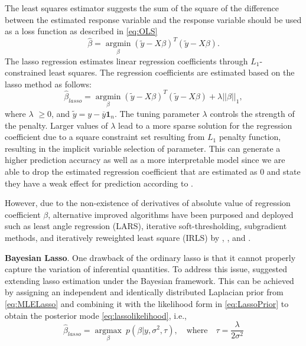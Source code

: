The least squares estimator suggests the sum of the square of the difference between the estimated response variable and the response variable should be used as a loss function as described in \autoref{eq:OLS}
\begin{equation}
\label{eq:OLS}
\widehat{\beta} = \underset{\beta}{\operatorname{argmin}}  (\widetilde{y} - X\beta)^T(\widetilde{y}-X\beta).
\end{equation}
The lasso regression estimates linear regression coefficients through $L_1$- constrained least squares. The regression coefficients are estimated based on the lasso method as follows:
\begin{equation}
	\label{eq:lasso1}
	\widehat{\beta}_{lasso} = \underset{\beta}{\operatorname{argmin}} (\widetilde{y}-X\beta)^T(\widetilde{y}-X\beta) + \lambda ||\beta||_1,
\end{equation}
where $\lambda$ $\geq 0$, and $\widetilde{y} =  y - \overline{y}\textbf{1}_n$. The tuning parameter $\lambda$ controls the strength of the penalty. Larger values of $\lambda$ lead to a more sparse solution for the regression coefficient due to a square constraint set resulting from $L_1$ penalty function, resulting in the implicit variable selection of parameter. This can generate a higher prediction accuracy as well as a more interpretable model since we are able to drop the estimated regression coefficient that are estimated as 0 and state they have a weak effect for prediction according to \cite{tibshirani_1996}.

However, due to the non-existence of derivatives of absolute value of regression coefficient $\beta$, alternative improved algorithms have been purposed and deployed such as least angle regression (LARS), iterative soft-thresholding, subgradient methods, and iteratively reweighted least square (IRLS) by \cite{efron_hastie_johnstone_tibshirani_2004},   \cite{beck_teboulle_2009}, \cite{nan_zhang_shuqing_zeng_2005} and \cite{friedman_hastie_tibshirani_2010}.

\noindent \textbf{Bayesian Lasso}.
One drawback of the ordinary lasso is that it cannot properly capture the variation of inferential quantities. To address this issue, \cite{tibshirani_1996} suggested extending lasso estimation under the Bayesian framework. This can be achieved by assigning an independent and identically distributed Laplacian prior from \autoref{eq:MLELasso} and combining it with the likelihood form in \autoref{eq:LassoPrior} to obtain the posterior mode \autoref{eq:lassolikelihood}, i.e.,
\begin{equation}
	\label{eq:MLELasso}
	\widehat{\beta}_{lasso} = \underset{\beta}{\operatorname{argmax}} \  p(\beta|y,\sigma^2,\tau), \quad \mbox{where} \quad  \tau = \frac{\lambda}{2\sigma^2}
\end{equation}


